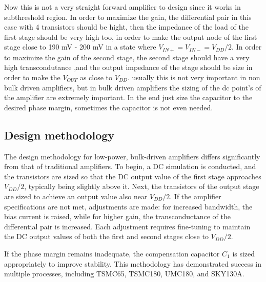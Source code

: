 \documentclass[12pt]{article}
\begin{document}
Now this is not a very straight forward amplifier to design since it works in subthreshold region.
In order to maximize the gain, the differential pair in this case with 4 transistors should be hight, then the impedance of the load of the first stage should be very high too, in order to make the output node of the first stage close to 190 mV - 200 mV in a state where $V_{IN+} = V_{IN-} = V_{DD}/2$. In order to maximize the gain of the second stage, the second stage should have a very high transcondutance ,and the output impedance of the stage should be size in order to make the $V_{OUT}$ as close to $V_{DD}$. usually this is not very important in non bulk driven amplifiers, but in bulk driven amplifiers the sizing of the dc point's of the amplifier are extremely important. In the end just size the capacitor to the desired phase margin, sometimes the capacitor is not even needed.

\subsection{Design methodology}

The design methodology for low-power, bulk-driven amplifiers differs significantly from that of traditional amplifiers. To begin, a DC simulation is conducted, and the transistors are sized so that the DC output value of the first stage approaches \( V_{DD}/2 \), typically being slightly above it. Next, the transistors of the output stage are sized to achieve an output value also near \( V_{DD}/2 \). If the amplifier specifications are not met, adjustments are made: for increased bandwidth, the bias current is raised, while for higher gain, the transconductance of the differential pair is increased. Each adjustment requires fine-tuning to maintain the DC output values of both the first and second stages close to \( V_{DD}/2 \).

If the phase margin remains inadequate, the compensation capacitor \( C_1 \) is sized appropriately to improve stability. This methodology has demonstrated success in multiple processes, including TSMC65, TSMC180, UMC180, and SKY130A.
\end{document}
